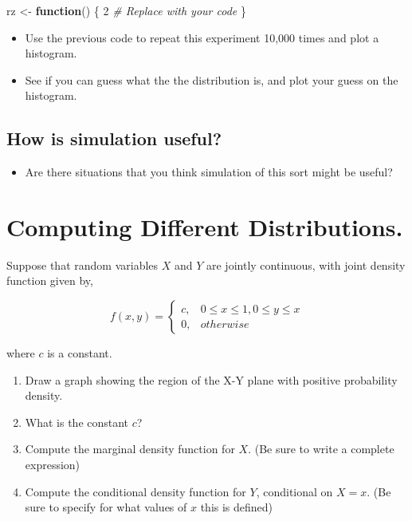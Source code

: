 \documentclass[
]{book}
\newenvironment{Shaded}{\begin{snugshade}}{\end{snugshade}}
\newcommand{\CommentTok}[1]{\textcolor[rgb]{0.56,0.35,0.01}{\textit{#1}}}
\newcommand{\ControlFlowTok}[1]{\textcolor[rgb]{0.13,0.29,0.53}{\textbf{#1}}}
\newcommand{\DecValTok}[1]{\textcolor[rgb]{0.00,0.00,0.81}{#1}}
\newcommand{\NormalTok}[1]{#1}
\newcommand{\OtherTok}[1]{\textcolor[rgb]{0.56,0.35,0.01}{#1}}
\providecommand{\tightlist}{%
  \setlength{\itemsep}{0pt}\setlength{\parskip}{0pt}}
\theoremstyle{definition}
\theoremstyle{definition}
\theoremstyle{definition}
\theoremstyle{definition}
\theoremstyle{remark}
\begin{document}
\begin{Shaded}
\begin{Highlighting}[]
\NormalTok{rz }\OtherTok{\textless{}{-}} \ControlFlowTok{function}\NormalTok{() \{}
  \DecValTok{2} \CommentTok{\# Replace with your code}
\NormalTok{\}}
\end{Highlighting}
\end{Shaded}

\begin{itemize}
\tightlist
\item
  Use the previous code to repeat this experiment 10,000 times and plot a histogram.
\item
  See if you can guess what the the distribution is, and plot your guess on the histogram.
\end{itemize}

\hypertarget{how-is-simulation-useful}{%
\subsection{How is simulation useful?}\label{how-is-simulation-useful}}

\begin{itemize}
\tightlist
\item
  Are there situations that you think simulation of this sort might be useful?
\end{itemize}

\hypertarget{computing-different-distributions.}{%
\section{Computing Different Distributions.}\label{computing-different-distributions.}}

Suppose that random variables \(X\) and \(Y\) are jointly continuous, with joint density function given by,

\[
f(x,y) = 
  \begin{cases}
    c, & 0 \leq x \leq 1, 0 \leq y \leq x \\
    0, & otherwise
\end{cases}
\]

where \(c\) is a constant.

\begin{enumerate}
\def\labelenumi{\arabic{enumi}.}
\tightlist
\item
  Draw a graph showing the region of the X-Y plane with positive probability density.
\item
  What is the constant \(c\)?
\item
  Compute the marginal density function for \(X\). (Be sure to write a complete expression)
\item
  Compute the conditional density function for \(Y\), conditional on \(X=x\). (Be sure to specify for what values of \(x\) this is defined)
\end{enumerate}
\end{document}
